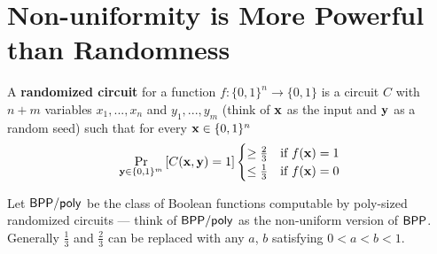 \documentclass[11pt]{article}
\begin{document}
\section{Non-uniformity is More Powerful than Randomness}
	\begin{definition}
		\label{def:randomizedcircuit}
		A \textbf{randomized circuit} for a function $f: \{0,1\}^n \rightarrow \{0,1\}$ is a circuit $C$ with $n + m$ variables $x_1, ..., x_n$ and $y_1, ..., y_m$ (think of $\mathbf{x}$ as the input and $\mathbf{y}$ as a random seed) such that for every $\mathbf{x} \in \{0,1\}^n$
		\[\Pr_{\mathbf{y} \in \{0,1\}^m}\left[C(\mathbf{x}, \mathbf{y}) = 1\right] \begin{cases}
		\geq \frac{2}{3} &\mbox{if $f(\mathbf{x}) = 1$}\\
		\leq \frac{1}{3} &\mbox{if $f(\mathbf{x}) = 0$}
		\end{cases}\]
	\end{definition}
	Let $\mathsf{BPP/poly}$ be the class of Boolean functions computable by poly-sized randomized circuits --- think of $\mathsf{BPP/poly}$ as the non-uniform version of $\mathsf{BPP}$. Generally $\frac{1}{3}$ and $\frac{2}{3}$ can be replaced with any $a$, $b$ satisfying $0 < a < b < 1$. 
	
\end{document}

